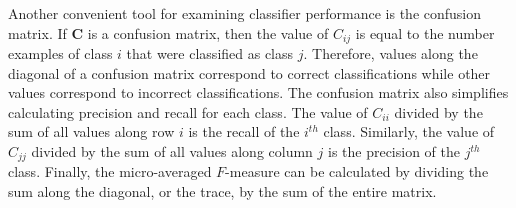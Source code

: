 \documentclass[twocolumn,final]{article}
\begin{document}
Another convenient tool for examining classifier performance is the confusion matrix.
If $\mathbf{C}$ is a confusion matrix, then the value of $C_{ij}$ is equal to the number examples of class $i$ that were classified as class $j$.
Therefore, values along the diagonal of a confusion matrix correspond to correct classifications while other values correspond to incorrect classifications.
The confusion matrix also simplifies calculating precision and recall for each class.
The value of $C_{ii}$ divided by the sum of all values along row $i$ is the recall of the $i^{th}$ class.
Similarly, the value of $C_{jj}$ divided by the sum of all values along column $j$ is the precision of the $j^{th}$ class.
Finally, the micro-averaged $F$-measure can be calculated by dividing the sum along the diagonal, or the trace, by the sum of the entire matrix.
\end{document}
